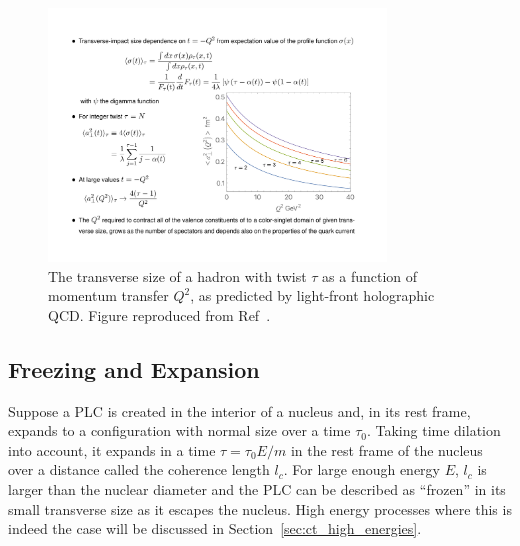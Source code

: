 \begin{figure}[!h]
    \centering
    \includegraphics[width=0.8\textwidth]{chap2/brodsky_transverse_size_2021.pdf}
    \caption{
            The transverse size of a hadron with twist $\tau$ as a function of
            momentum transfer $Q^2$, as predicted by light-front holographic
            QCD.
            Figure reproduced from Ref~\cite{Brodsky_2021}.
            }
    \label{fig:brodsky_transverse_size_2021}
\end{figure}




\subsection{Freezing and Expansion}
Suppose a PLC is created in the interior of a nucleus and, in its rest frame,
expands to a configuration with normal size over a time $\tau_0$.
Taking time dilation into account, it expands in a time $\tau=\tau_0E/m$ in the
rest frame of the nucleus over a distance called the coherence length $l_c$.
For large enough energy $E$, $l_c$ is larger than the nuclear diameter and the
PLC can be described as ``frozen'' in its small transverse size as it escapes
the nucleus.
High energy processes where this is indeed the case will be discussed in
Section~\ref{sec:ct_high_energies}.


